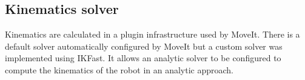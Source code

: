 \subsection{Kinematics solver}
Kinematics are calculated in a plugin infrastructure used by MoveIt. There is a default solver automatically configured by MoveIt but a custom solver was implemented using IKFast. It allows an analytic solver to be configured to compute the kinematics of the robot in an analytic approach.


